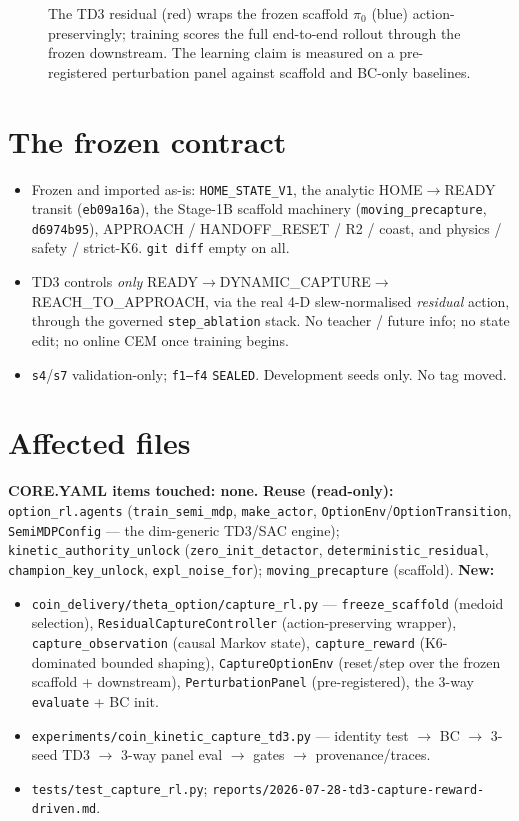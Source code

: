 \documentclass[11pt]{article}
\newcommand{\code}[1]{\texttt{\small #1}}
\begin{document}
\begin{figure}[h]\centering\caption{The TD3 residual (red) wraps the frozen scaffold $\pi_0$ (blue)
action-preservingly; training scores the full end-to-end rollout through the frozen downstream. The learning claim is
measured on a pre-registered perturbation panel against scaffold and BC-only baselines.}\end{figure}

\section{The frozen contract}
\begin{itemize}[nosep,leftmargin=1.4em]
  \item Frozen and imported as-is: \code{HOME\_STATE\_V1}, the analytic HOME$\to$READY transit (\code{eb09a16a}), the
  Stage-1B scaffold machinery (\code{moving\_precapture}, \code{d6974b95}), APPROACH / HANDOFF\_RESET / R2 / coast, and
  physics / safety / strict-K6. \code{git diff} empty on all.
  \item TD3 controls \emph{only} READY$\to$DYNAMIC\_CAPTURE$\to$REACH\_TO\_APPROACH, via the real 4-D slew-normalised
  \emph{residual} action, through the governed \code{step\_ablation} stack. No teacher / future info; no state edit; no
  online CEM once training begins.
  \item \code{s4}/\code{s7} validation-only; \code{f1--f4} \code{SEALED}. Development seeds only. No tag moved.
\end{itemize}

\section{Affected files}
\textbf{CORE.YAML items touched: none.} \textbf{Reuse (read-only):} \code{option\_rl.agents} (\code{train\_semi\_mdp},
\code{make\_actor}, \code{OptionEnv}/\code{OptionTransition}, \code{SemiMDPConfig} --- the dim-generic TD3/SAC engine);
\code{kinetic\_authority\_unlock} (\code{zero\_init\_detactor}, \code{deterministic\_residual}, \code{champion\_key\_unlock},
\code{expl\_noise\_for}); \code{moving\_precapture} (scaffold). \textbf{New:}
\begin{itemize}[nosep,leftmargin=1.4em]
  \item \code{coin\_delivery/theta\_option/capture\_rl.py} --- \code{freeze\_scaffold} (medoid selection),
  \code{ResidualCaptureController} (action-preserving wrapper), \code{capture\_observation} (causal Markov state),
  \code{capture\_reward} (K6-dominated bounded shaping), \code{CaptureOptionEnv} (reset/step over the frozen scaffold +
  downstream), \code{PerturbationPanel} (pre-registered), the 3-way \code{evaluate} + BC init.
  \item \code{experiments/coin\_kinetic\_capture\_td3.py} --- identity test $\to$ BC $\to$ 3-seed TD3 $\to$ 3-way panel
  eval $\to$ gates $\to$ provenance/traces.
  \item \code{tests/test\_capture\_rl.py}; \code{reports/2026-07-28-td3-capture-reward-driven.md}.
\end{itemize}
\end{document}
